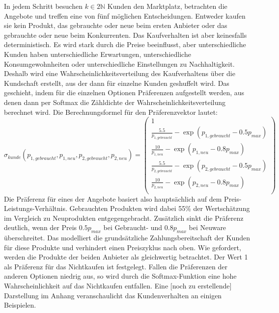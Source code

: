 In jedem Schritt besuchen $k \in 2\mathbb{N}$ Kunden den Marktplatz, betrachten die Angebote und treffen eine von fünf möglichen Entscheidungen.
Entweder kaufen sie kein Produkt, das gebrauchte oder neue beim ersten Anbieter oder das gebrauchte oder neue beim Konkurrenten.
Das Kaufverhalten ist aber keinesfalls deterministisch.
Es wird stark durch die Preise beeinflusst, aber unterschiedliche Kunden haben unterschiedliche Erwartungen, unterschiedliche Konsumgewohnheiten oder unterschiedliche Einstellungen zu Nachhaltigkeit.
Deshalb wird eine Wahrscheinlichkeitsverteilung des Kaufverhaltens über die Kundschaft erstellt, aus der dann für einzelne Kunden geshuffelt wird.
Das geschieht, indem für die einzelnen Optionen Präferenzen aufgestellt werden, aus denen dann per Softmax die Zähldichte der Wahrscheinlichkeitsverteilung berechnet wird.
Die Berechnungsformel für den Präferenzvektor lautet:
\begin{equation}
	\sigma_{kunde}(p_{1, gebraucht}, p_{1, neu}, p_{2, gebraucht}, p_{2, neu}) =
	\begin{pmatrix}
		1\\
		\frac{5.5}{p_{1, gebraucht}} - \exp{(p_{1, gebraucht} - 0.5 p_{max})}\\
		\frac{10}{p_{1, neu}} - \exp{(p_{1, neu} - 0.8 p_{max})}\\
		\frac{5.5}{p_{2, gebraucht}} - \exp{(p_{2, gebraucht} - 0.5 p_{max})}\\
		\frac{10}{p_{2, neu}} - \exp{(p_{2, neu} - 0.8 p_{max})}\\
	\end{pmatrix}
\end{equation}
Die Präferenz für eines der Angebote basiert also hauptsächlich auf dem Preis-Leistungs-Verhältnis.
Gebrauchten Produkten wird dabei 55\% der Wertschätzung im Vergleich zu Neuprodukten entgegengebracht.
Zusätzlich sinkt die Präferenz deutlich, wenn der Preis $0.5 p_{max}$ bei Gebraucht- und $0.8 p_{max}$ bei Neuware überschreitet.
Das modelliert die grundsätzliche Zahlungsbereitschaft der Kunden für diese Produkte und verhindert einen Preiszyklus nach oben.
Wie gefordert, werden die Produkte der beiden Anbieter als gleichwertig betrachtet.
Der Wert 1 als Präferenz für das Nichtkaufen ist festgelegt.
Fallen die Präferenzen der anderen Optionen niedrig aus, so wird durch die Softmax-Funktion eine hohe Wahrscheinlichkeit auf das Nichtkaufen entfallen.
Eine [noch zu erstellende] Darstellung im Anhang veranschaulicht das Kundenverhalten an einigen Beispielen.

